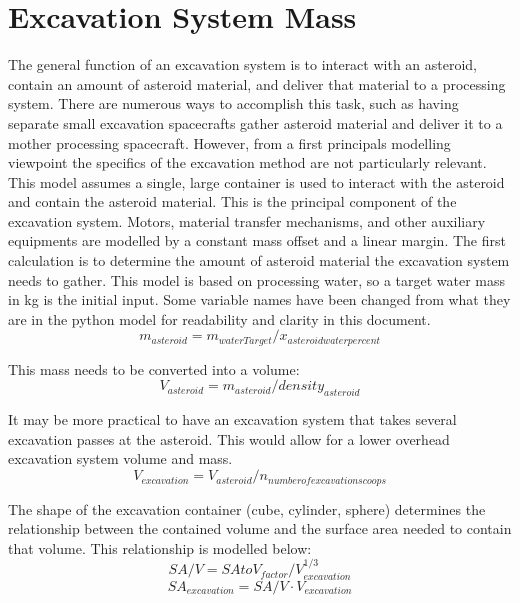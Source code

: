 \section{Excavation System Mass}
The general function of an excavation system is to interact with an asteroid, contain an amount of asteroid material, and deliver that material to a processing system. There are numerous ways to accomplish this task, such as having separate small excavation spacecrafts gather asteroid material and deliver it to a mother processing spacecraft. However, from a first principals modelling viewpoint the specifics of the excavation method are not particularly relevant. 
\newline
This model assumes a single, large container is used to interact with the asteroid and contain the asteroid material. This is the principal component of the excavation system. Motors, material transfer mechanisms, and other auxiliary equipments are modelled by a constant mass offset and a linear margin.
\newline 
The first calculation is to determine the amount of asteroid material the excavation system needs to gather. This model is based on processing water, so a target water mass in kg is the initial input. Some variable names have been changed from what they are in the python model for readability and clarity in this document. 
\begin{equation}
    m_{asteroid} = m_{waterTarget} / x_{asteroid water percent}
\end{equation}

This mass needs to be converted into a volume:
\begin{equation}
    V_{asteroid} = m_{asteroid} / density_{asteroid}
\end{equation}

It may be more practical to have an excavation system that takes several excavation passes at the asteroid. This would allow for a lower overhead excavation system volume and mass.
\begin{equation}
    V_{excavation} = V_{asteroid} / n_{number of excavation scoops}
\end{equation}

The shape of the excavation container (cube, cylinder, sphere) determines the relationship between the contained volume and the surface area needed to contain that volume. This relationship is modelled below:
\begin{equation}
    SA/V = SAtoV_{factor} / V_{excavation}^{1/3}
\end{equation}
\begin{equation}
    SA_{excavation} = SA/V \cdot V_{excavation}
\end{equation}

